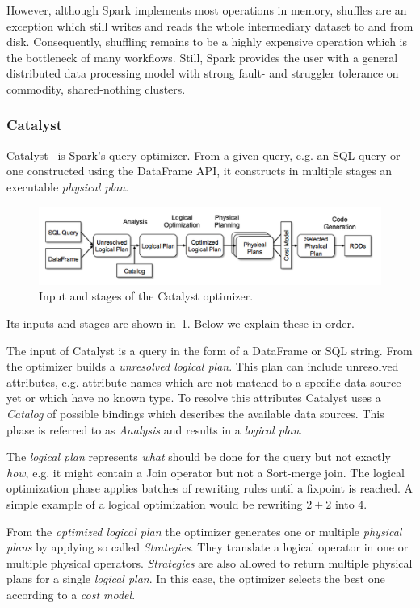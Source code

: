 However, although Spark implements most operations in memory, shuffles are an exception which still writes and reads
the whole intermediary dataset to and from disk.
Consequently, shuffling remains to be a highly expensive operation which is the bottleneck of many workflows.
Still, Spark provides the user with a general distributed data processing model with strong fault- and struggler tolerance
on commodity, shared-nothing clusters.

\subsubsection{Catalyst}
Catalyst~\cite{catalyst} is Spark's query optimizer.
From a given query, e.g. an SQL query or one constructed using the DataFrame API, it constructs
in multiple stages an executable \textit{physical plan}.
\begin{figure}
    \includegraphics{figures/catalyst-stages.png}
    \caption{Input and stages of the Catalyst optimizer.}
    \label{fig:catalyst-stages}
\end{figure}
Its inputs and stages are shown in~\cref{fig:catalyst-stages}.
Below we explain these in order.

The input of Catalyst is a query in the form of a DataFrame or SQL string.
From the optimizer builds a \textit{unresolved logical plan}.
This plan can include unresolved attributes, e.g. attribute names which are not matched to a specific
data source yet or which have no known type.
To resolve this attributes Catalyst uses a \textit{Catalog} of possible bindings which describes the
available data sources.
This phase is referred to as \textit{Analysis} and results in a \textit{logical plan}.

The \textit{logical plan} represents \textit{what} should be done for the query but not exactly \textit{how},
e.g. it might contain a Join operator but not a Sort-merge join.
The logical optimization phase applies batches of rewriting rules until a fixpoint is reached.
A simple example of a logical optimization would be rewriting $2 + 2$ into $4$.

From the \textit{optimized logical plan} the optimizer generates one or multiple \textit{physical plans} by
applying so called \textit{Strategies}.
They translate a logical operator in one or multiple physical operators.
\textit{Strategies} are also allowed to return multiple physical plans for a single \textit{logical plan}.
In this case, the optimizer selects the best one according to a \textit{cost model}.

